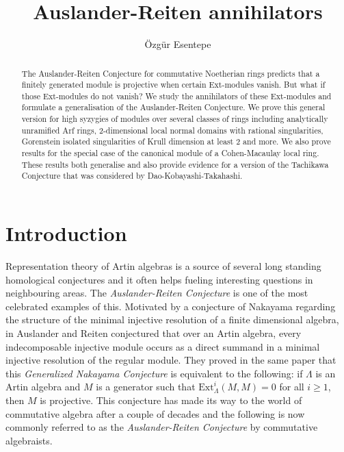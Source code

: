 \documentclass[12pt]{amsart}
\title{Auslander-Reiten annihilators}
\author[\"{O}.~Esentepe]{\"{O}zg\"{u}r Esentepe}
\newcommand{\Ext}{\mathrm{Ext}}
\theoremstyle{definition}
\numberwithin{equation}{theorem}
\begin{document}
\begin{abstract}
    The Auslander-Reiten Conjecture for commutative Noetherian rings predicts that a finitely generated module is projective when certain Ext-modules vanish. But what if those Ext-modules do not vanish? We study the annihilators of these Ext-modules and formulate a generalisation of the Auslander-Reiten Conjecture. We prove this general version for high syzygies of modules over several classes of rings including analytically unramified Arf rings, 2-dimensional local normal domains with rational singularities, Gorenstein isolated singularities of Krull dimension at least 2 and more. We also prove results for the special case of the canonical module of a Cohen-Macaulay local ring. These results both generalise and also provide evidence for a version of the Tachikawa Conjecture that was considered by Dao-Kobayashi-Takahashi.
\end{abstract}

\maketitle


\thispagestyle{empty}



\section{Introduction}

Representation theory of Artin algebras is a source of several long standing homological conjectures and it often helps fueling interesting questions in neighbouring areas. The \textit{Auslander-Reiten Conjecture} is one of the most celebrated examples of this. Motivated by a conjecture of Nakayama \cite{Nakayama} regarding the structure of the minimal injective resolution of a finite dimensional algebra, in \cite{Auslander-Reiten} Auslander and Reiten conjectured that over an Artin algebra, every indecomposable injective module occurs as a direct summand in a minimal injective resolution of the regular module. They proved in the same paper that this \textit{Generalized Nakayama Conjecture} is equivalent to the following: if $\Lambda$ is an Artin algebra and $M$ is a generator such that $\Ext_\Lambda^i(M,M) = 0$ for all $i \geq 1$, then $M$ is projective. This conjecture has made its way to the world of commutative algebra after a couple of decades and the following is now commonly referred to as the \textit{Auslander-Reiten Conjecture} by commutative algebraists.
\end{document}
